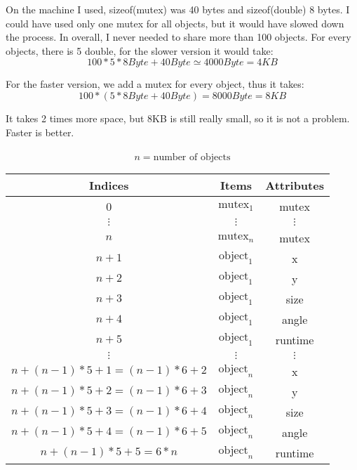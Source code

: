 On the machine I used, sizeof(mutex) was 40 bytes and sizeof(double) 8 
bytes. I could have used only one mutex for all objects, but it would 
have slowed down the process. In overall, I never needed to share more 
than 100 objects. For every objects, there is 5 double, for the slower 
version it would take:
\begin{displaymath}
                100 * 5 * 8Byte +40Byte \simeq 4000 Byte = 4 KB 
\end{displaymath}

For the faster version, we add a mutex for every object, thus it takes:
\begin{displaymath}
                        100 * (5*8Byte +40Byte) = 8000Byte = 8KB
\end{displaymath}

It takes 2 times more space, but 8KB is still really small, so it is 
not a problem. Faster is better.
\\
\\
\begin{displaymath}
    n = \mbox{number of objects}
\end{displaymath}
\begin{center}
\begin{tabular}{c|c|c}
\label{tab:mosm:ms}
   {\bf Indices }   & {\bf Items }  & {\bf Attributes} \\ \hline
   0                & $\mbox{mutex}_1$  & mutex \\ \hline
   $\vdots$         & $\vdots$          & $\vdots$      \\ \hline  
   $n$              & $\mbox{mutex}_n$  & mutex \\ \hline
   $n+1$            & $\mbox{object}_1$ & x \\ \hline
   $n+2$            & $\mbox{object}_1$ & y \\ \hline
   $n+3$            & $\mbox{object}_1$ & size \\ \hline 
   $n+4$            & $\mbox{object}_1$ & angle \\ \hline
   $n+5$            & $\mbox{object}_1$ & runtime \\ \hline
   $\vdots$         & $\vdots$ & $\vdots$ \\ \hline
   $n + (n-1)*5 +1 = (n-1)*6+2 $ & $\mbox{object}_n$ & x \\ \hline
   $n + (n-1)*5 +2 = (n-1)*6+3$ & $\mbox{object}_n$ & y \\ \hline
   $n + (n-1)*5 +3 = (n-1)*6+4$ & $\mbox{object}_n$ & size \\ \hline 
   $n + (n-1)*5 +4 = (n-1)*6+5$ & $\mbox{object}_n$ & angle \\ \hline
   $n + (n-1)*5 +5 = 6*n$ & $\mbox{object}_n$ & runtime
\end{tabular}
\end{center}

